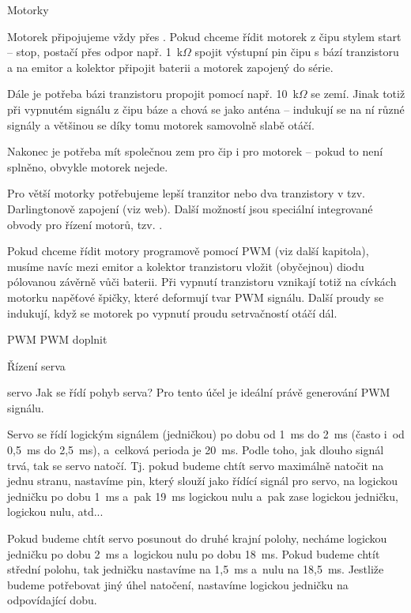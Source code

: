 \secc Motorky

Motorek připojujeme vždy přes \Black .  
Pokud chceme řídit motorek z čipu stylem start -- stop, postačí přes odpor např. 1~k$\Omega$ spojit výstupní pin čipu s bází tranzistoru a na emitor a kolektor připojit baterii a motorek zapojený do série. 

Dále je potřeba bázi tranzistoru propojit pomocí např. 10~k$\Omega$ se zemí. Jinak totiž při vypnutém signálu z čipu báze  a chová se jako anténa -- indukují se na ní různé signály a většinou se díky tomu motorek samovolně slabě otáčí.   

Nakonec je potřeba mít společnou zem pro čip i pro motorek -- pokud to není splněno, obvykle motorek nejede. 

Pro větší motorky potřebujeme lepší tranzitor nebo dva tranzistory v tzv. Darlingtonově zapojení (viz web). Další možností jsou speciální integrované obvody pro řízení motorů, tzv.  \Black .  

Pokud chceme řídit motory programově pomocí PWM (viz další kapitola), musíme navíc mezi emitor a kolektor tranzistoru vložit (obyčejnou) diodu pólovanou závěrně vůči baterii. Při vypnutí tranzistoru vznikají totiž na cívkách motorku napěťové špičky, které deformují tvar PWM signálu.  Další proudy se indukují, když se motorek po vypnutí proudu setrvačností otáčí dál. 

\secc PWM
 \iid PWM  
doplnit 

\secc Řízení serva

\ii servo Jak se řídí pohyb serva? Pro tento účel je ideální právě generování PWM signálu. 

Servo se řídí logickým signálem (jedničkou) po dobu od 1~ms do 2~ms (často i~od 0,5~ms do 2,5~ms), a~celková perioda je 20~ms. Podle toho, jak dlouho signál trvá, tak se servo natočí. Tj. pokud budeme chtít servo maximálně natočit na jednu stranu, nastavíme pin, který slouží jako řídící signál pro servo, na logickou jedničku po dobu 1~ms a~pak 19~ms logickou nulu a~pak zase logickou jedničku, logickou nulu, atd... 

Pokud budeme chtít servo posunout do druhé krajní polohy, necháme logickou jedničku po dobu 2~ms a~logickou nulu po dobu 18~ms. Pokud budeme chtít střední polohu, tak jedničku nastavíme na 1,5~ms a~nulu na 18,5~ms. Jestliže budeme potřebovat jiný úhel natočení, nastavíme logickou jedničku na odpovídající dobu.

